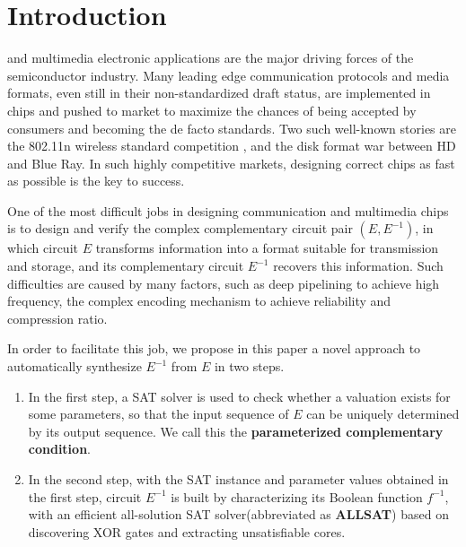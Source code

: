\documentclass[journal]{IEEEtran}
\begin{document}
\newtheorem{algo}{Algorithm}
\newtheorem{definition11}{Definition}
\newtheorem{theorem}{Theorem}

\section{Introduction}\label{sec_intro}
 and multimedia electronic applications are the major driving forces of the semiconductor industry.
Many leading edge communication protocols and media formats,
even still in their non-standardized draft status,
are implemented in chips and pushed to market
to maximize the chances of being accepted by consumers and becoming the de facto standards.
Two such well-known stories are the 802.11n wireless standard competition \cite{IEEE80211N},
and the disk format war between HD and Blue Ray\cite{BRHDVD}.
In such highly competitive markets,
designing correct chips as fast as possible is the key to success.

One of the most difficult jobs in designing communication and multimedia chips
is to design and verify the complex complementary circuit pair $(E,E^{-1})$,
in which circuit $E$ transforms information into a format suitable for transmission and storage,
and its complementary circuit $E^{-1}$ recovers this information.
Such difficulties are caused by many factors,
such as deep pipelining to achieve high frequency,
the complex encoding mechanism to achieve reliability and compression ratio.

In order to facilitate this job,
we propose in this paper a novel approach to automatically synthesize $E^{-1}$ from $E$ in two steps.

\begin{enumerate}
  \item In the first step, a SAT solver is used to check
        whether a valuation exists for some parameters,
        so that
	the input sequence of $E$ can be uniquely determined by its output sequence.
	We call this the \textbf{parameterized complementary condition}.
  \item In the second step,
        with the SAT instance and parameter values obtained in the first step,
	circuit $E^{-1}$ is built by characterizing its Boolean function $f^{-1}$,
with an efficient all-solution SAT solver(abbreviated as \textbf{ALLSAT}) based on discovering XOR gates and extracting unsatisfiable cores.
\end{enumerate}
\end{document}

